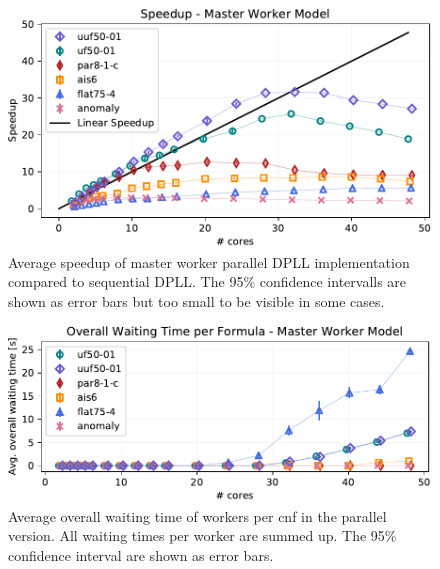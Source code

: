 \documentclass[letterpaper]{article}
\begin{document}
\begin{figure}[t]
    \centering
    \includegraphics[width=\columnwidth]{figures/scaling_parallel_subset_dpll_scaling_tar.pdf}
    \caption{Average speedup of master worker parallel DPLL implementation compared to sequential DPLL.
    The 95\% confidence intervalls are shown as error bars but too small to be visible in some cases.
    \label{fig:dpll_parallel_speedup}}
\end{figure}
\begin{figure}[t]
    \centering
    \includegraphics[width=\columnwidth]{figures/waiting_parallel_subset_dpll_scaling_tar.pdf}
    \caption{Average overall waiting time of workers per cnf in the parallel version.
    All waiting times per worker are summed up.
    The 95\% confidence interval are shown as error bars.}
    \label{fig:dpll_parallel_waiting}
\end{figure}
\end{document}
